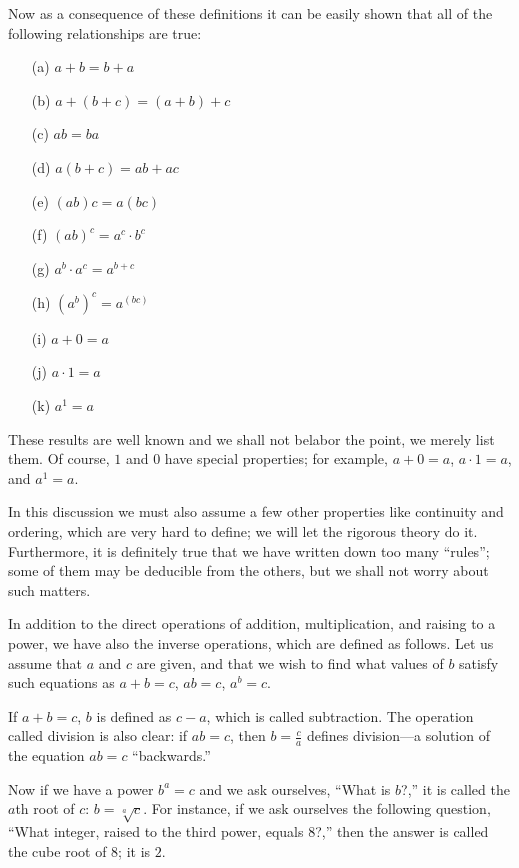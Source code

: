 \documentclass[10pt,twocolumn]{article}
\begin{document}
Now as a consequence of these definitions it can be easily shown that all of the following relationships are true:
\begin{itemize}
  \item[(a)] \( a + b = b + a \) 
	\item[(b)] \( a + (b + c) = (a + b) + c \)
  \item[(c)] \( ab = ba \) 
	\item[(d)] \( a(b + c) = ab + ac \)
  \item[(e)] \( (ab)c = a(bc) \) 
	\item[(f)] \( (ab)^c = a^c \cdot b^c \)
  \item[(g)] \( a^b \cdot a^c = a^{b+c} \) 
	\item[(h)] \( (a^b)^c = a^{(bc)} \)
  \item[(i)] \( a + 0 = a \) 
	\item[(j)] \( a \cdot 1 = a \)
  \item[(k)] \( a^1 = a \)
\end{itemize}

These results are well known and we shall not belabor the point, we merely list them. Of course, \( 1 \) and \( 0 \) have special properties; for example, \( a + 0 = a \), \( a \cdot 1 = a \), and \( a^1 = a \).

In this discussion we must also assume a few other properties like continuity and ordering, which are very hard to define; we will let the rigorous theory do it. Furthermore, it is definitely true that we have written down too many ``rules''; some of them may be deducible from the others, but we shall not worry about such matters.

In addition to the direct operations of addition, multiplication, and raising to a power, we have also the inverse operations, which are defined as follows. Let us assume that \( a \) and \( c \) are given, and that we wish to find what values of \( b \) satisfy such equations as \( a + b = c \), \( ab = c \), \( a^b = c \). 

If \( a + b = c \), \( b \) is defined as \( c - a \), which is called subtraction. The operation called division is also clear: if \( ab = c \), then \( b = \frac{c}{a} \) defines division---a solution of the equation \( ab = c \) ``backwards.''

Now if we have a power \( b^a = c \) and we ask ourselves, ``What is \( b \)?,'' it is called the \( a \)th root of \( c \): \( b = \sqrt[a]{c} \). For instance, if we ask ourselves the following question, ``What integer, raised to the third power, equals \( 8 \)?,'' then the answer is called the cube root of \( 8 \); it is \( 2 \).
\end{document}
